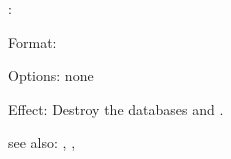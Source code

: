 :

Format: 

Options: none

Effect:  Destroy the databases  and .

see also: \consult, \destroy, \replace 

